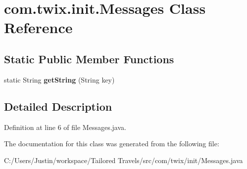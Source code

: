 \hypertarget{classcom_1_1twix_1_1init_1_1_messages}{\section{com.\-twix.\-init.\-Messages Class Reference}
\label{classcom_1_1twix_1_1init_1_1_messages}
}
\subsection*{Static Public Member Functions}
\begin{DoxyCompactItemize}
\item 
\hypertarget{classcom_1_1twix_1_1init_1_1_messages_a72950ea242561155a95d339e0e0388fe}{static String {\bfseries get\-String} (String key)}\label{classcom_1_1twix_1_1init_1_1_messages_a72950ea242561155a95d339e0e0388fe}

\end{DoxyCompactItemize}


\subsection{Detailed Description}


Definition at line 6 of file Messages.\-java.



The documentation for this class was generated from the following file\-:\begin{DoxyCompactItemize}
\item 
C\-:/\-Users/\-Justin/workspace/\-Tailored Travels/src/com/twix/init/Messages.\-java\end{DoxyCompactItemize}
